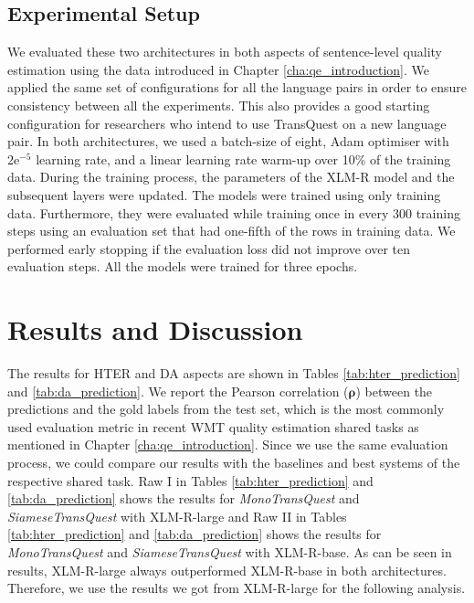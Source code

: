 \subsection{Experimental Setup}
\label{sec:transquest_experiment}
We evaluated these two architectures in both aspects of sentence-level quality estimation using the data introduced in Chapter \ref{cha:qe_introduction}. We applied the same set of configurations for all the language pairs in order to ensure consistency between all the experiments. This also provides a good starting configuration for researchers who intend to use TransQuest on a new language pair. In both architectures, we used a batch-size of eight, Adam optimiser with $2\mathrm{e}^{-5}$ learning rate, and a linear learning rate warm-up over 10\% of the training data. During the training process, the parameters of the XLM-R model and the subsequent layers were updated. The models were trained using only training data. Furthermore, they were evaluated while training once in every 300 training steps using an evaluation set that had one-fifth of the rows in training data. We performed early stopping if the evaluation loss did not improve over ten evaluation steps. All the models were trained for three epochs.

\section{Results and Discussion}
\label{sec:transquest_results}
The results for HTER and DA aspects are shown in Tables \ref{tab:hter_prediction} and \ref{tab:da_prediction}. We report the Pearson correlation ($\bm{\rho}$) between the predictions and the gold labels from the test set, which is the most commonly used evaluation metric in recent WMT quality estimation shared tasks \autocite{specia-etal-2018-findings,fonseca-etal-2019-findings,specia-etal-2020-findings-wmt} as mentioned in Chapter \ref{cha:qe_introduction}. Since we use the same evaluation process, we could compare our results with the baselines and best systems of the respective shared task. Raw I in Tables \ref{tab:hter_prediction} and \ref{tab:da_prediction} shows the results for \textit{MonoTransQuest} and \textit{SiameseTransQuest} with XLM-R-large and Raw II in Tables \ref{tab:hter_prediction} and \ref{tab:da_prediction} shows the results for \textit{MonoTransQuest} and \textit{SiameseTransQuest} with XLM-R-base. As can be seen in results, XLM-R-large always outperformed XLM-R-base in both architectures. Therefore, we use the results we got from XLM-R-large for the following analysis.

